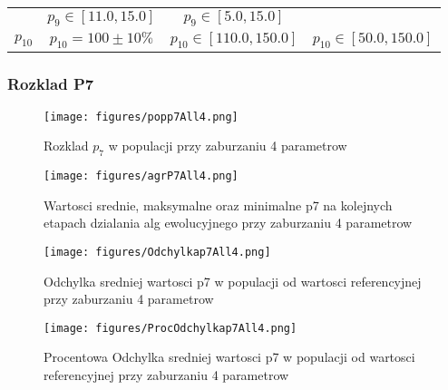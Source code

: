 \documentclass[]{article}
\begin{document}
\begin{longtable}[c]{@{}lccc@{}}
\begin{minipage}[t]{0.26\columnwidth}
\strut\end{minipage} &
\begin{minipage}[t]{0.24\columnwidth}\centering\strut
\(p_9 \in [11.0,15.0]\)
\strut\end{minipage} &
\begin{minipage}[t]{0.26\columnwidth}\centering\strut
\(p_9 \in [5.0,15.0]\)
\strut\end{minipage}\tabularnewline
\begin{minipage}[t]{0.13\columnwidth}\raggedright\strut
\(p_{10}\)
\strut\end{minipage} &
\begin{minipage}[t]{0.26\columnwidth}\centering\strut
\(p_{10} = 100 \pm 10 \%\)
\strut\end{minipage} &
\begin{minipage}[t]{0.24\columnwidth}\centering\strut
\(p_{10} \in [110.0,150.0]\)
\strut\end{minipage} &
\begin{minipage}[t]{0.26\columnwidth}\centering\strut
\(p_{10} \in [50.0,150.0]\)
\strut\end{minipage}\tabularnewline
\bottomrule
\end{longtable}

\subsubsection{Rozklad P7}\label{rozklad-p7}

\begin{figure}[htbp]
\centering
\texttt{[image: figures/popp7All4.png]}
\caption{Rozklad \(p_7\) w populacji przy zaburzaniu 4 parametrow}
\end{figure}

\begin{figure}[htbp]
\centering
\texttt{[image: figures/agrP7All4.png]}
\caption{Wartosci srednie, maksymalne oraz minimalne p7 na kolejnych
etapach dzialania alg ewolucyjnego przy zaburzaniu 4 parametrow}
\end{figure}

\begin{figure}[htbp]
\centering
\texttt{[image: figures/Odchylkap7All4.png]}
\caption{Odchylka sredniej wartosci p7 w populacji od wartosci
referencyjnej przy zaburzaniu 4 parametrow}
\end{figure}

\begin{figure}[htbp]
\centering
\texttt{[image: figures/ProcOdchylkap7All4.png]}
\caption{Procentowa Odchylka sredniej wartosci p7 w populacji od
wartosci referencyjnej przy zaburzaniu 4 parametrow}
\end{figure}
\end{document}
